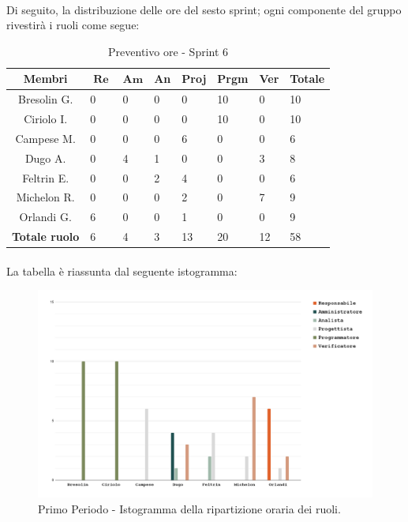 \documentclass[10pt, a4paper]{article}
\begin{document}
{{{{{{{{{{{{{\paragraph{}Di seguito, la distribuzione delle ore del sesto sprint; ogni componente del gruppo rivestirà i ruoli come segue:
\begin{table}[H]
\begin{tabularx}{\textwidth}{c|X|X|X|X|X|X|X}
        \textbf{Membri} & $\operatorname{\textbf{Re}}$ & $\mathrm{\textbf{Am}}$ & \textbf{An} & \textbf{Proj} & \textbf{Prgm} & \textbf{Ver} & \textbf{Totale} \\
        \hline Bresolin G. & 0 & 0 & 0 & 0 & \cellcolor{primarycolor}10 & 0 & 10 \\
        \hline Ciriolo I.  & 0 & 0 & 0 & 0 & \cellcolor{primarycolor}10 & 0 & 10 \\
        \hline Campese M.  & 0 & 0 & 0 & \cellcolor{primarycolor}6 & 0 & 0 & 6 \\
        \hline Dugo A.     & 0 & \cellcolor{primarycolor}4 & 1 & 0 & 0 & 3 & 8 \\
        \hline Feltrin E.  & 0 & 0 & 2 & \cellcolor{primarycolor}4 & 0 & 0 & 6 \\
        \hline Michelon R. & 0 & 0 & 0 & 2 & 0 & \cellcolor{primarycolor}7 & 9 \\
        \hline Orlandi G.  & \cellcolor{primarycolor}6 & 0 & 0 & 1 & 0 & 0 & 9 \\
        \hline
        \textbf{Totale ruolo} & 6 & 4 & 3 & 13 & 20 & 12 & 58 
    \end{tabularx}
    \caption{Preventivo ore - Sprint 6}
    \end{table}

\paragraph{}La tabella è riassunta dal seguente istogramma:
 \begin{figure}[H]
        \centering        
        \includegraphics[width=15.5cm]{istogrammi/istogramma_6_periodo.png}
        \caption{Primo Periodo - Istogramma della ripartizione oraria dei ruoli. }
    \end{figure}


}}}}}}}}}}}}}
\end{document}
